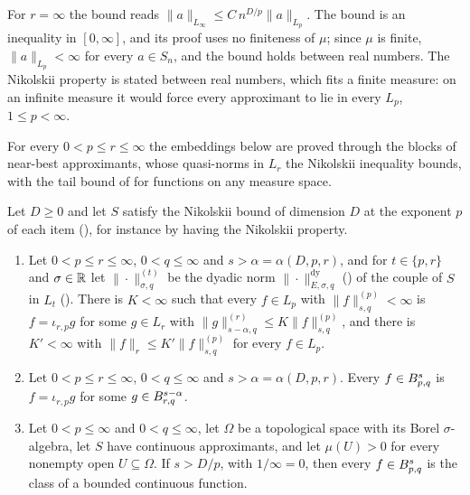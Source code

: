 For $r = \infty$ the bound reads $\|a\|_{L_\infty} \leq C \, n^{D/p} \|a\|_{L_p}$. The bound is
an inequality in $[0, \infty]$, and its proof uses no finiteness of $\mu$; since $\mu$ is finite,
$\|a\|_{L_p} < \infty$ for every $a \in S_n$, and the bound holds between real numbers. The
Nikolskii property is stated between real numbers, which fits a finite measure: on an infinite
measure it would force every approximant to lie in every $L_p$, $1 \leq p < \infty$.

For every $0 < p \leq r \leq \infty$ the embeddings below are proved through the blocks of
near-best approximants, whose quasi-norms in $L_r$ the Nikolskii inequality bounds, with the
tail bound of  for functions on any measure space.

\begin{theorem}
\label{thm:besov-embedding}
\leanok
{}
Let $D \geq 0$ and let $S$ satisfy the Nikolskii bound of dimension $D$ at the exponent $p$ of
each item (), for instance by having the Nikolskii property.
\begin{enumerate}
  \item Let $0 < p \leq r \leq \infty$, $0 < q \leq \infty$ and $s > \alpha = \alpha(D, p, r)$,
    and for $t \in \{p, r\}$ and $\sigma \in \mathbb{R}$ let $\|\cdot\|^{(t)}_{\sigma, q}$ be the dyadic
    norm $\|\cdot\|^{\mathrm{dy}}_{E, \sigma, q}$ () of the couple of $S$ in
    $L_t$ (). There is $K < \infty$ such that every $f \in L_p$ with
    $\|f\|^{(p)}_{s, q} < \infty$ is $f = \iota_{r,p} g$ for some $g \in L_r$ with
    $\|g\|^{(r)}_{s - \alpha, q} \leq K \|f\|^{(p)}_{s, q}$, and there is $K' < \infty$ with
    $\|f\|_r \leq K' \|f\|^{(p)}_{s, q}$ for every $f \in L_p$.
  \item Let $0 < p \leq r \leq \infty$, $0 < q \leq \infty$ and
    $s > \alpha = \alpha(D, p, r)$. Every $f \in B^{s}_{p,q}$ is $f = \iota_{r,p} g$ for some
    $g \in B^{s-\alpha}_{r,q}$.
  \item Let $0 < p \leq \infty$ and $0 < q \leq \infty$, let $\Omega$ be a topological
    space with its Borel $\sigma$-algebra, let $S$ have continuous approximants, and let
    $\mu(U) > 0$ for every nonempty open $U \subseteq \Omega$. If $s > D/p$, with
    $1/\infty = 0$, then every $f \in B^{s}_{p,q}$ is the class of a bounded continuous
    function.
\end{enumerate}
\end{theorem}

